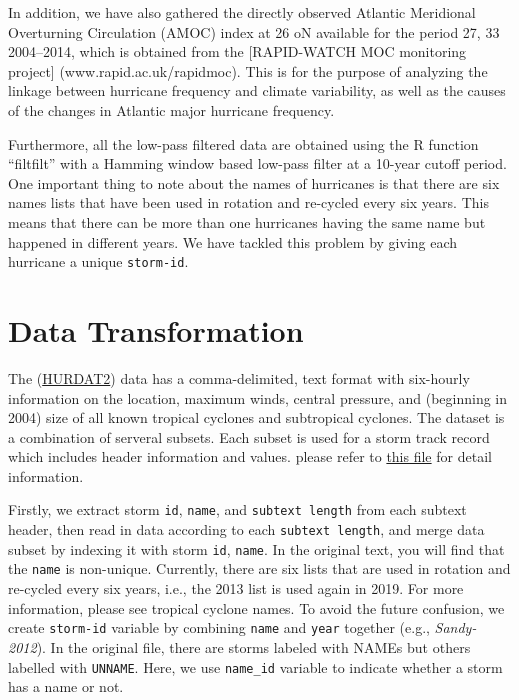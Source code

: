 \documentclass[]{book}
\begin{document}
In addition, we have also gathered the directly observed Atlantic Meridional Overturning Circulation (AMOC) index at 26 oN available for the period 27, 33 2004--2014, which is obtained from the {[}RAPID-WATCH MOC monitoring project{]} (www.rapid.ac.uk/rapidmoc). This is for the purpose of analyzing the linkage between hurricane frequency and climate variability, as well as the causes of the changes in Atlantic major hurricane frequency.

Furthermore, all the low-pass filtered data are obtained using the R function ``filtfilt'' with a Hamming window based low-pass filter at a 10-year cutoff period. One important thing to note about the names of hurricanes is that there are six names lists that have been used in rotation and re-cycled every six years. This means that there can be more than one hurricanes having the same name but happened in different years. We have tackled this problem by giving each hurricane a unique \texttt{storm-id}.

\hypertarget{datatrans}{%
\chapter{Data Transformation}\label{datatrans}}

The (\href{https://www.nhc.noaa.gov/data/hurdat/hurdat2-format-atlantic.pdf}{HURDAT2}) data has a comma-delimited, text format with six-hourly information on the location, maximum winds, central pressure, and (beginning in 2004) size of all known tropical cyclones and subtropical cyclones. The dataset is a combination of serveral subsets. Each subset is used for a storm track record which includes header information and values.
please refer to \href{https://www.nhc.noaa.gov/data/hurdat/hurdat2-format-atlantic.pdf}{this file} for detail information.

Firstly, we extract storm \texttt{id}, \texttt{name}, and \texttt{subtext\ length} from each subtext header, then read in data according to each \texttt{subtext\ length}, and merge data subset by indexing it with storm \texttt{id}, \texttt{name}. In the original text, you will find that the \texttt{name} is non-unique. Currently, there are six lists that are used in rotation and re-cycled every six years, i.e., the 2013 list is used again in 2019. For more information, please see tropical cyclone names. To avoid the future confusion, we create \texttt{storm-id} variable by combining \texttt{name} and \texttt{year} together (e.g., \emph{Sandy-2012}). In the original file, there are storms labeled with NAMEs but others labelled with \texttt{UNNAME}. Here, we use \texttt{name\_id} variable to indicate whether a storm has a name or not.
\end{document}
